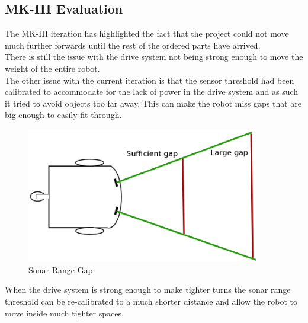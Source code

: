 \subsection{MK-III Evaluation}
The MK-III iteration has highlighted the fact that the project could not move much further forwards until the rest of the ordered parts have arrived.
\\There is still the issue with the drive system not being strong enough to move the weight of the entire robot.
\\The other issue with the current iteration is that the sensor threshold had been calibrated to accommodate for the lack of power in the drive system and as such it tried to avoid objects too far away.  This can make the robot miss gaps that are big enough to easily fit through.
\begin{figure}[H]
\centering
        \includegraphics[width=4.0in]  {Images/sonar-range.png}
        \caption{Sonar Range Gap}
        \label{Sonar Range Gap}
\end{figure}
When the drive system is strong enough to make tighter turns the sonar range threshold can be re-calibrated to a much shorter distance and allow the robot to move inside much tighter spaces.

